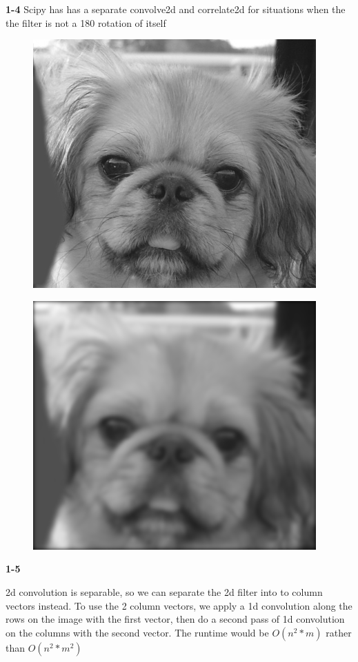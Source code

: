 \documentclass[]{article}
\begin{document}
\textbf{1-4}
Scipy has has a separate convolve2d and correlate2d for situations when the the filter is not a 180 rotation of itself
\begin{figure}[H]
	\centering
	\includegraphics{dog-grey.png}
	\label{fig:dog-grey}
\end{figure}

\begin{figure}[H]
	\centering
	\includegraphics{dog-greyblur.png}
	\label{fig:dog-grey-blur}
\end{figure}

\textbf{1-5}

2d convolution is separable, so we can separate the 2d filter into to column vectors instead.
To use the 2 column vectors, we apply a 1d convolution along the rows on the image with the first vector, 
then do a second pass of 1d convolution on the columns with the second vector. The runtime would be $O(n^2 * m)$
rather than $O(n^2 * m^2)$
\end{document}
